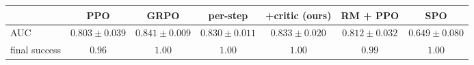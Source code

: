 \begin{tabular}{lcccccc}
\toprule
 & PPO & GRPO & per-step & +critic (ours) & RM + PPO & SPO \\
\midrule
AUC & $0.803\pm0.039$ & $0.841\pm0.009$ & $0.830\pm0.011$ & $0.833\pm0.020$ & $0.812\pm0.032$ & $0.649\pm0.080$ \\
final success & $0.96$ & $1.00$ & $1.00$ & $1.00$ & $0.99$ & $1.00$ \\
\bottomrule
\end{tabular}
